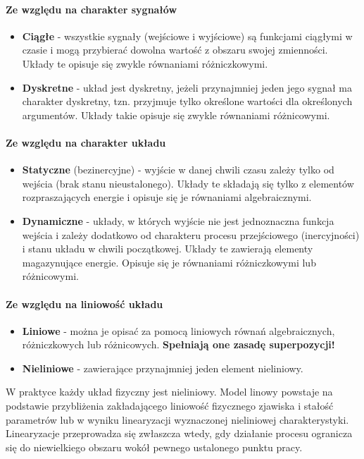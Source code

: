 \documentclass[a4paper,twoside]{report}
\begin{document}
\paragraph{Ze względu na charakter sygnałów}
\begin{itemize}
	\item \textbf{Ciągłe }- wszystkie sygnały (wejściowe i wyjściowe) są funkcjami ciągłymi w czasie i mogą
	przybierać dowolna wartość z obszaru swojej zmienności. Układy te opisuje się zwykle równaniami różniczkowymi.
	\item \textbf{Dyskretne} - układ jest dyskretny, jeżeli przynajmniej jeden jego sygnał ma charakter dyskretny,
	tzn. przyjmuje tylko określone wartości dla określonych argumentów. Układy takie opisuje się zwykle równaniami
	różnicowymi.
\end{itemize}
\paragraph{Ze względu na charakter układu}
\begin{itemize}
	\item \textbf{Statyczne} (bezinercyjne) - wyjście w
	danej chwili czasu zależy tylko od wejścia (brak
	stanu nieustalonego). Układy te składają się
	tylko z elementów rozpraszających energie i
	opisuje się je równaniami algebraicznymi.
	\item \textbf{Dynamiczne} - układy, w których wyjście
	nie jest jednoznaczna funkcja wejścia i zależy
	dodatkowo od charakteru procesu
	przejściowego (inercyjności) i stanu układu w
	chwili początkowej. Układy te zawierają
	elementy magazynujące energie. Opisuje się je
	równaniami różniczkowymi lub różnicowymi.
\end{itemize}  
\paragraph{Ze względu na liniowość układu}
\begin{itemize}
	\item \textbf{Liniowe} - można je opisać za pomocą liniowych równań
	algebraicznych, różniczkowych lub różnicowych.
	\textbf{Spełniają one zasadę superpozycji!}
	\item \textbf{Nieliniowe} - zawierające przynajmniej jeden element
	nieliniowy.
\end{itemize}

W praktyce każdy układ fizyczny jest nieliniowy. Model linowy powstaje
	na podstawie przybliżenia zakładającego liniowość fizycznego
	zjawiska i stałość parametrów lub w wyniku linearyzacji wyznaczonej
	nieliniowej charakterystyki. Linearyzacje przeprowadza się zwłaszcza
	wtedy, gdy działanie procesu ogranicza się do niewielkiego obszaru
	wokół pewnego ustalonego punktu pracy.
	
\end{document}

